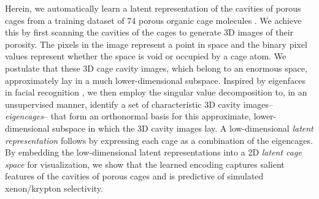 \documentclass[journal=jacsat,manuscript=article,layout=traditional]{achemso}
\begin{document}
Herein, we automatically learn a latent representation of the cavities of porous cages from a training dataset of 74 porous organic cage molecules \cite{miklitz2017computational,greenaway2018high}. We achieve this by first scanning the cavities of the cages to generate 3D images of their porosity. The pixels in the image represent a point in space and the binary pixel values represent whether the space is void or occupied by a cage atom.
We postulate that these 3D cage cavity images, which belong to an enormous space, approximately lay in a much lower-dimensional subspace. Inspired by eigenfaces in facial recognition \cite{sirovich1987low,turk1991face,muller2004singular}, we then employ the singular value decomposition to, in an unsupervised manner, identify a set of characteristic 3D cavity images-- \emph{eigencages}-- that form an orthonormal basis for this approximate, lower-dimensional subspace in which the 3D cavity images lay. A low-dimensional \emph{latent representation} follows by expressing each cage as a combination of the eigencages. By embedding the low-dimensional latent representations into a 2D \emph{latent cage space} for visualization, we show that the learned encoding captures salient features of the cavities of porous cages and is predictive of simulated xenon/krypton selectivity.



\end{document}

